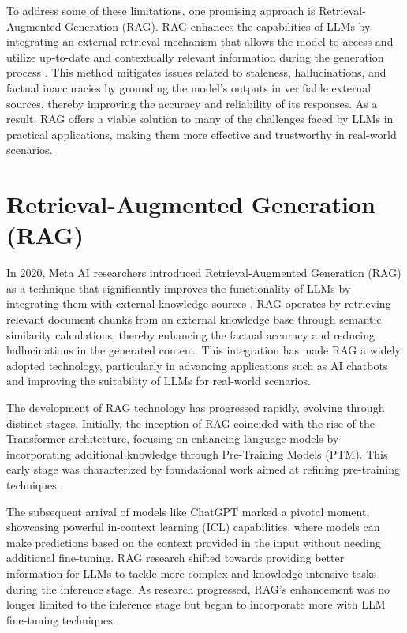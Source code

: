 To address some of these limitations, one promising approach is Retrieval-Augmented Generation (RAG). RAG enhances the capabilities of LLMs by integrating an external retrieval mechanism that allows the model to access and utilize up-to-date and contextually relevant information during the generation process \cite{lewis2020retrieval}. This method mitigates issues related to staleness, hallucinations, and factual inaccuracies by grounding the model’s outputs in verifiable external sources, thereby improving the accuracy and reliability of its responses. As a result, RAG offers a viable solution to many of the challenges faced by LLMs in practical applications, making them more effective and trustworthy in real-world scenarios.

\section{Retrieval-Augmented Generation (RAG)}

In 2020, Meta AI researchers introduced Retrieval-Augmented Generation (RAG) as a technique that significantly improves the functionality of LLMs by integrating them with external knowledge sources \cite{lewis2020retrieval}. RAG operates by retrieving relevant document chunks from an external knowledge base through semantic similarity calculations, thereby enhancing the factual accuracy and reducing hallucinations in the generated content. This integration has made RAG a widely adopted technology, particularly in advancing applications such as AI chatbots and improving the suitability of LLMs for real-world scenarios.

The development of RAG technology has progressed rapidly, evolving through distinct stages. Initially, the inception of RAG coincided with the rise of the Transformer architecture, focusing on enhancing language models by incorporating additional knowledge through Pre-Training Models (PTM). This early stage was characterized by foundational work aimed at refining pre-training techniques \cite{arora2023gar, lewis2020retrieval, borgeaud2022improving}. 

The subsequent arrival of models like ChatGPT marked a pivotal moment, showcasing powerful in-context learning (ICL) capabilities, where models can make predictions based on the context provided in the input without needing additional fine-tuning. RAG research shifted towards providing better information for LLMs to tackle more complex and knowledge-intensive tasks during the inference stage. As research progressed, RAG’s enhancement was no longer limited to the inference stage but began to incorporate more with LLM fine-tuning techniques.

